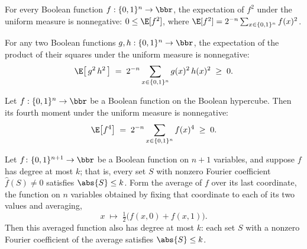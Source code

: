 \begin{lemma}
\label{BooleanAnalysis.Hypercontractivity.expect_sq_nonneg}
\leanok
{}
For every Boolean function $f : \{0,1\}^n \to \bbr$, the expectation of $f^2$ under the
uniform measure is nonnegative: $0 \le \E[f^2]$, where $\E[f^2] =
2^{-n}\sum_{x\in\{0,1\}^n} f(x)^2$.
\end{lemma}

\begin{lemma}
\label{BooleanAnalysis.Hypercontractivity.expect_sq_nonneg_prod}
\leanok
{}
For any two Boolean functions $g, h : \{0,1\}^n \to \bbr$, the expectation of the
product of their squares under the uniform measure is nonnegative:
\[
\E\!\left[\,g^2\, h^2\,\right] \;=\; 2^{-n} \sum_{x \in \{0,1\}^n} g(x)^2\, h(x)^2
\;\ge\; 0.
\]
\end{lemma}

\begin{lemma}
\label{BooleanAnalysis.Hypercontractivity.expect_fourth_nonneg}
\leanok
{}
Let $f : \{0,1\}^n \to \bbr$ be a Boolean function on the Boolean hypercube. Then its
fourth moment under the uniform measure is nonnegative:
\[
  \E\!\left[f^4\right] \;=\; 2^{-n}\sum_{x\in\{0,1\}^n} f(x)^4 \;\ge\; 0.
\]
\end{lemma}

\begin{lemma}
\label{BooleanAnalysis.Hypercontractivity.degree_avgLast}
\leanok
{}
Let $f\colon\{0,1\}^{n+1}\to\bbr$ be a Boolean function on $n+1$ variables, and suppose
$f$ has degree at most $k$; that is, every set $S$ with nonzero Fourier coefficient
$\hat f(S)\ne 0$ satisfies $\abs{S}\le k$. Form the average of $f$ over its last
coordinate, the function on $n$ variables obtained by fixing that coordinate to each of
its two values and averaging,
\[
  x \;\longmapsto\; \tfrac12\bigl(f(x,0) + f(x,1)\bigr).
\]
Then this averaged function also has degree at most $k$: each set $S$ with a nonzero
Fourier coefficient of the average satisfies $\abs{S}\le k$.
\end{lemma}

